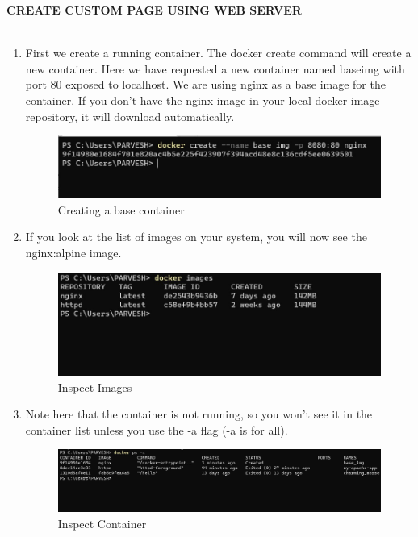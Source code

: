 \documentclass[12pt]{article}
\begin{document}
\textbf{\uppercase {Create Custom page using Web Server}} \\
\vspace{0.1\baselineskip} \\

\begin{enumerate}
\item First we create a running container. The docker create command will create a new container. Here we have requested a new container named baseimg with port 80 exposed to localhost. We are using nginx as a base image for the container. If you don’t have the nginx image in your local docker image repository, it will download automatically.

\begin{figure}[H]
\centering
\includegraphics[scale=0.7]{fig26}
\caption{Creating a base container}
\vspace{0.6\baselineskip}
\end{figure}	

\item If you look at the list of images on your system, you will now see the nginx:alpine image.

\begin{figure}[H]
\centering
\includegraphics[scale=0.7]{fig27}
\caption{Inspect Images}
\vspace{0.6\baselineskip}
\end{figure}	


\item Note here that the container is not running, so you won’t see it in the container list unless you use the -a flag (-a is for all).

\begin{figure}[H]
\centering
\includegraphics[scale=0.5]{fig28}
\caption{Inspect Container}
\vspace{0.6\baselineskip}
\end{figure}	


\end{enumerate}
\end{document}
